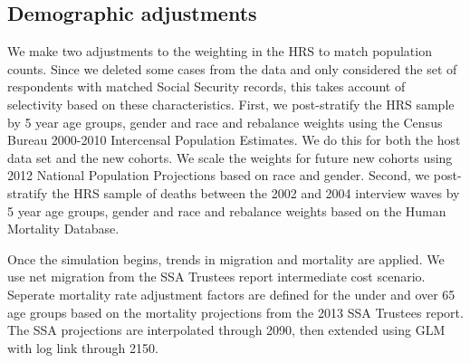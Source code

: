 \subsection{Demographic adjustments}
We make two adjustments to the weighting in the HRS to match population counts. Since we deleted some 
cases from the data and only considered the set of respondents with matched Social Security records, 
this takes account of selectivity based on these characteristics. First, we post-stratify the HRS sample 
by 5 year age groups, gender and race and rebalance weights using the Census Bureau 2000-2010 Intercensal 
Population Estimates. We do this for both the host data set and the new cohorts. We scale the weights for 
future new cohorts using 2012 National Population Projections based on race and gender. Second, we post-
stratify the HRS sample of deaths between the 2002 and 2004 interview waves by 5 year age groups, gender 
and race and rebalance weights based on the Human Mortality Database. 
 
Once the simulation begins, trends in migration and mortality are applied.  We use net migration from
the SSA Trustees report intermediate cost scenario.  Seperate mortality rate adjustment factors are 
defined for the under and over 65 age groups based on the mortality projections from the 2013 SSA
Trustees report.  The SSA projections are interpolated through 2090, then extended using GLM with log 
link through 2150.